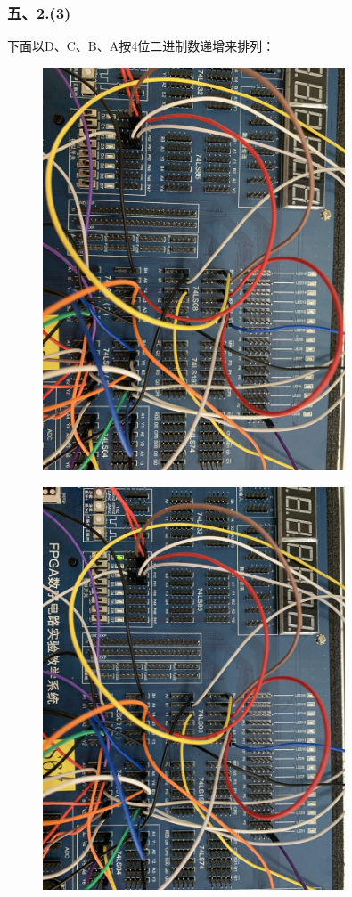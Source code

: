 \documentclass[UTF8, a4paper, 11pt]{article}
\begin{document}
\subsubsection{五、2.(3)}
下面以D、C、B、A按4位二进制数递增来排列：
\begin{figure}[H]
    \centering
    \includegraphics[width=0.8\textwidth]{0000.JPG}
\end{figure}
\begin{figure}[H]
    \centering
    \includegraphics[width=0.8\textwidth]{0001.JPG}
\end{figure}
\end{document}
